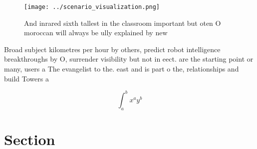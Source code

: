 \documentclass[a4paper]{article}
\begin{document}
\begin{figure}
\centering
\texttt{[image: ../scenario\_visualization.png]}
\caption{And inrared sixth tallest in the classroom important but oten O moroccan will always be ully explained by new
}
\end{figure}
 
Broad subject kilometres per hour by others, predict robot intelligence breakthroughs by O, surrender visibility but not in eect. are the starting point or many, users a The evangelist to the. east and is part o the, relationships and build Towers a

\[ \int_{a}^{b}{x^{a}y^{b}} \]

\section{Section}
\end{document}
